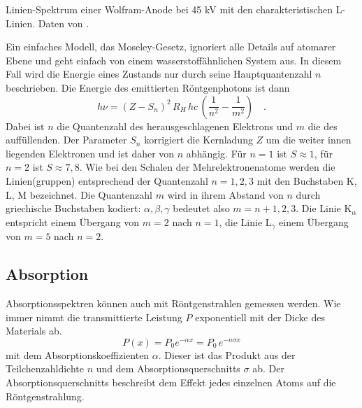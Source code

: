 \begin{marginfigure}
    \caption{Linien-Spektrum einer Wolfram-Anode bei 45 kV mit den charakteristischen L-Linien. Daten von \cite{Gilfrich68}.}
    \label{fig:7_linienspektrum}
\end{marginfigure}


Ein einfaches Modell, das Moseley-Gesetz, ignoriert alle Details auf atomarer Ebene und geht einfach von einem wasserstoffähnlichen System aus. In diesem Fall wird die Energie eines Zustands nur durch seine Hauptquantenzahl $n$ beschrieben. Die Energie des emittierten Röntgenphotons ist dann 
\begin{equation}
    h \nu = (Z - S_n)^2 \, R_H \, hc \, \left(  \frac{1}{n^2} - \frac{1}{m^2} \right) \quad .
\end{equation}
Dabei ist $n$ die Quantenzahl des herausgeschlagenen Elektrons und $m$ die des auffüllenden. Der Parameter $S_n$ korrigiert die Kernladung $Z$ um die weiter innen liegenden Elektronen und ist daher von $n$ abhängig. Für $n=1$ ist $S \approx 1$, für $n=2$ ist $S \approx 7,8$.
Wie bei den Schalen der Mehrelektronenatome werden die Linien(gruppen) entsprechend der Quantenzahl $n = 1, 2, 3$ mit den Buchstaben K, L, M bezeichnet. Die Quantenzahl $m$ wird in ihrem Abstand von $n$ durch griechische Buchstaben kodiert: $\alpha, \beta, \gamma$ bedeutet also $m=n + 1,2,3$. Die Linie K$_\alpha$ entspricht einem Übergang von $m=2$ nach $n=1$, die Linie L$_\gamma$ einem Übergang von $m=5$ nach $n=2$.

\subsection{Absorption}

Absorptionsspektren können auch mit Röntgenstrahlen gemessen werden. Wie immer nimmt die transmittierte Leistung $P$ exponentiell mit der Dicke des Materials ab.
\begin{equation}
    P(x)  = P_0 e^{- \alpha x} = P_0 \, e^{- n \sigma  x}
\end{equation}
mit dem Absorptionskoeffizienten $\alpha$. Dieser ist das Produkt aus der Teilchenzahldichte $n$ und dem Absorptionsquerschnitts $\sigma$ ab. Der Absorptionsquerschnitts beschreibt dem Effekt jedes einzelnen Atoms auf die Röntgenstrahlung.

